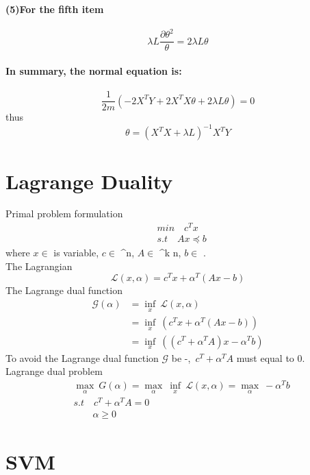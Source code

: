 \documentclass[UTF8]{article}
\begin{document}
\paragraph{(5)For the fifth item}
$$\lambda L \frac{\partial \theta^2}{\theta} = 2\lambda L \theta$$

\paragraph{In summary, the normal equation is:}
$$\frac{1}{2m}\left(-2X^TY+2X^TX\theta+2\lambda L\theta \right) = 0$$
thus
$$\theta = \left(X^TX + \lambda L \right)^{-1}X^TY$$

\section{Lagrange Duality}
\noindent Primal problem formulation
\begin{align*}
  &min \quad c^Tx  \\
  &s.t \quad Ax \preceq b
\end{align*}
where $x \in $ is variable, $c \in$ ^n, $A \in$ ^{k \times n}, $b \in $ . \\
The Lagrangian
$$
\mathcal{L}(x,\alpha) = c^Tx + \alpha^T(Ax - b)
$$
The Lagrange dual function
\begin{align*}
\mathcal{G}(\alpha) &= \inf_x \ \mathcal{L}(x,\alpha) \\
&=\inf_x \ (c^Tx + \alpha^T(Ax - b)) \\
& = \inf_x \ ((c^T+\alpha^TA)x-\alpha^Tb)
\end{align*}
To avoid the Lagrange dual function $\mathcal{G}$ be -\infty,\ $c^T + \alpha^TA$ must equal to 0. \\
Lagrange dual problem
\begin{align*}
  &\max_\alpha \ G(\alpha) = \max_\alpha \ \inf_x\ \mathcal{L}(x,\alpha) = \max_\alpha \  -\alpha^Tb \\
  &s.t \quad c^T + \alpha^TA = 0 \\
  &\quad \quad \alpha \geq 0
\end{align*}


\section{SVM}
\end{document}
